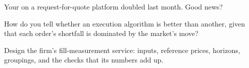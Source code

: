 \begin{interviewq}\label{iq:rs:measuring-market-making-and-execution:4}
Your  on a request-for-quote platform doubled last month. Good news?
\end{interviewq}

\begin{interviewq}\label{iq:rs:measuring-market-making-and-execution:5}
How do you tell whether an execution algorithm is better than another, given that each order's shortfall is dominated by the market's move?
\end{interviewq}

\begin{interviewq}\label{iq:rs:measuring-market-making-and-execution:6}
Design the firm's fill-measurement service: inputs, reference prices, horizons, groupings, and the checks that its numbers add up.
\end{interviewq}
